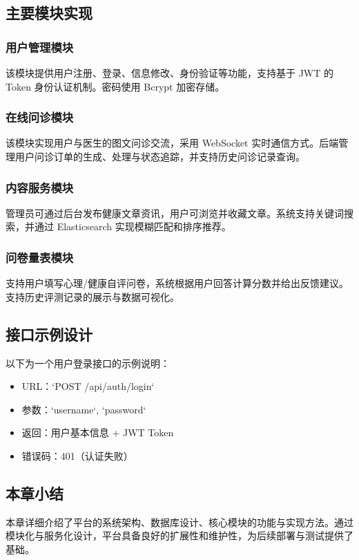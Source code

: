 \subsection{主要模块实现}

\subsubsection{用户管理模块}

该模块提供用户注册、登录、信息修改、身份验证等功能，支持基于 JWT 的 Token 身份认证机制。密码使用 Bcrypt 加密存储。

\subsubsection{在线问诊模块}

该模块实现用户与医生的图文问诊交流，采用 WebSocket 实时通信方式。后端管理用户问诊订单的生成、处理与状态追踪，并支持历史问诊记录查询。

\subsubsection{内容服务模块}

管理员可通过后台发布健康文章资讯，用户可浏览并收藏文章。系统支持关键词搜索，并通过 Elasticsearch 实现模糊匹配和排序推荐。

\subsubsection{问卷量表模块}

支持用户填写心理/健康自评问卷，系统根据用户回答计算分数并给出反馈建议。支持历史评测记录的展示与数据可视化。

\subsection{接口示例设计}

以下为一个用户登录接口的示例说明：

\begin{itemize}
  \item URL：`POST /api/auth/login`
  \item 参数：`username`, `password`
  \item 返回：用户基本信息 + JWT Token
  \item 错误码：401（认证失败）
\end{itemize}

\subsection{本章小结}

本章详细介绍了平台的系统架构、数据库设计、核心模块的功能与实现方法。通过模块化与服务化设计，平台具备良好的扩展性和维护性，为后续部署与测试提供了基础。
